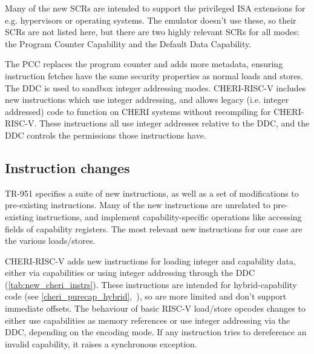 Many of the new SCRs are intended to support the privileged ISA extensions for e.g. hypervisors or operating systems.
The emulator doesn't use these, so their SCRs are not listed here, but there are two highly relevant SCRs for all modes: the Program Counter Capability and the Default Data Capability.

The PCC replaces the program counter and adds more metadata, ensuring instruction fetches have the same security properties as normal loads and stores.
The DDC is used to sandbox integer addressing modes.
CHERI-RISC-V includes new instructions which use integer addressing, and allows legacy (i.e. integer addressed) code to function on CHERI systems without recompiling for CHERI-RISC-V.
These instructions all use integer addresses relative to the DDC, and the DDC controls the permissions those instructions have.

\subsection{Instruction changes}\label{cheri_instructions}
TR-951\cite[Chapter 8]{TR-951} specifies a suite of new instructions, as well as a set of modifications to pre-existing instructions.
Many of the new instructions are unrelated to pre-existing instructions, and implement capability-specific operations like accessing fields of capability registers.
The most relevant new instructions for our case are the various loads/stores.

\pagebreak
CHERI-RISC-V adds new instructions for loading integer and capability data, either via capabilities or using integer addressing through the DDC (\cref{tab:new_cheri_instrs}).
These instructions are intended for hybrid-capability code (see \cref{cheri_purecap_hybrid},~\cite[p151]{TR-951}), so are more limited and don't support immediate offsets.
The behaviour of basic RISC-V load/store opcodes changes to either use capabilities as memory references or use integer addressing via the DDC, depending on the encoding mode.
If any instruction tries to dereference an invalid capability, it raises a synchronous exception.

